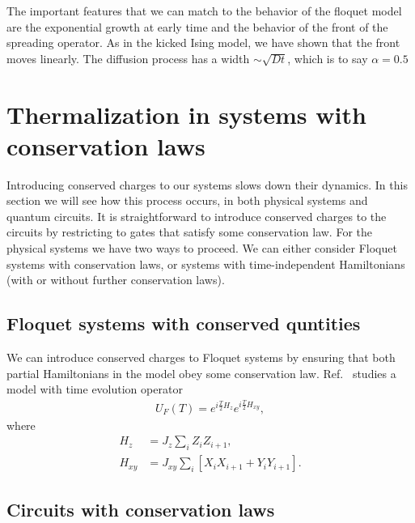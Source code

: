 \documentclass[a4paper,12pt]{article}
\newcommand{\nn}{\nonumber\\}
\newcommand{\note}[1]{{\color{red}{#1}}}
\begin{document}
The important features that we can match to the behavior of the floquet model are the exponential growth at early time and the behavior of the front of the spreading operator. As in the kicked Ising model, we have shown that the front moves linearly. The diffusion process has a width $\sim \sqrt{Dt}$, which is to say $\alpha=0.5$

\note{vonKeyserlingk page 6.}


\section{Thermalization in systems with conservation laws} \label{sec:cons}

Introducing conserved charges to our systems slows down their dynamics. In this section we will see how this process occurs, in both physical systems and quantum circuits. It is straightforward to introduce conserved charges to the circuits by restricting to gates that satisfy some conservation law. For the physical systems we have two ways to proceed. We can either consider Floquet systems with conservation laws, or systems with time-independent Hamiltonians (with or without further conservation laws).

\subsection{Floquet systems with conserved quntities} \label{sub:fcons}

We can introduce conserved charges to Floquet systems by ensuring that both partial Hamiltonians in the model obey some conservation law. Ref.~\cite{KhemaniOpSp} studies a model with time evolution operator
\begin{align}
U_F(T)=e^{i\frac{T}{2}H_z}e^{i\frac{T}{2}H_{xy}},
\end{align}
where
\begin{align}
H_z &= J_z\sum_i Z_iZ_{i+1},\nn
H_{xy} &= J_{xy}\sum_i\left[X_iX_{i+1}+Y_iY_{i+1}\right].
\end{align}

\note{In these ``physical systems," it is possible to have approximately conserved charges, i.e. on the localized side of a phase transition\dots}

\subsection{Circuits with conservation laws} \label{sub:ccons}
\end{document}
